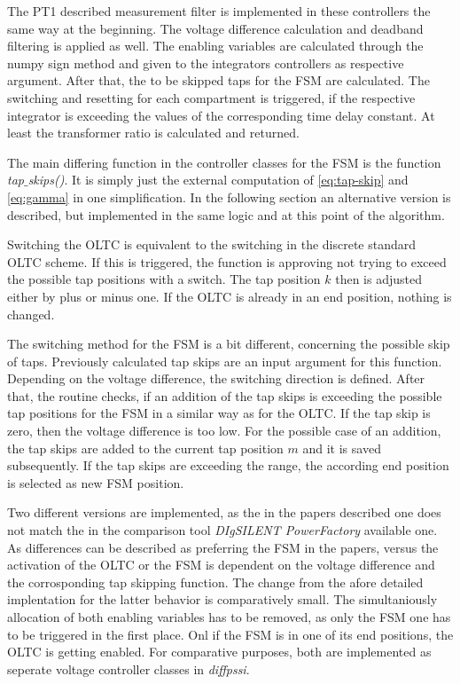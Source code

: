 The PT1 described measurement filter is implemented in these controllers the same way at the beginning.
The voltage difference calculation and deadband filtering is applied as well.
The enabling variables are calculated through the numpy sign method and given to the integrators controllers as respective argument.
After that, the to be skipped taps for the \acs{FSM} are calculated.
The switching and resetting for each compartment is triggered, if the respective integrator is exceeding the values of the corresponding time delay constant.
At least the transformer ratio is calculated and returned.

The main differing function in the controller classes for the \acs{FSM} is the function \textit{tap$\_$skips()}.
It is simply just the external computation of \autoref{eq:tap-skip} and \autoref{eq:gamma} in one simplification.
In the following section an alternative version is described, but implemented in the same logic and at this point of the algorithm.

Switching the \acs{OLTC} is equivalent to the switching in the discrete standard \acs{OLTC} scheme.
If this is triggered, the function is approving not trying to exceed the possible tap positions with a switch.
The tap position $k$ then is adjusted either by plus or minus one.
If the \acs{OLTC} is already in an end position, nothing is changed.

The switching method for the \acs{FSM} is a bit different, concerning the possible skip of taps.
Previously calculated tap skips are an input argument for this function.
Depending on the voltage difference, the switching direction is defined.
After that, the routine checks, if an addition of the tap skips is exceeding the possible tap positions for the \acs{FSM} in a similar way as for the \acs{OLTC}.
If the tap skip is zero, then the voltage difference is too low.
For the possible case of an addition, the tap skips are added to the current tap position $m$ and it is saved subsequently.
If the tap skips are exceeding the range, the according end position is selected as new \acs{FSM} position. 

Two different versions are implemented, as the in the papers described one \autocite{burlakin_2024,burlakin_2024a} does not match the in the comparison tool \textit{DIgSILENT PowerFactory} available one.
As differences can be described as preferring the \acs{FSM} in the papers, versus the activation of the \acs{OLTC} or the \acs{FSM} is dependent on the voltage difference and the corrosponding tap skipping function.
The change from the afore detailed implentation for the latter behavior is comparatively small.
The simultaniously allocation of both enabling variables has to be removed, as only the \acs{FSM} one has to be triggered in the first place.
Onl if the \acs{FSM} is in one of its end positions, the \acs{OLTC} is getting enabled.
For comparative purposes, both are implemented as seperate voltage controller classes in \textit{diffpssi}.

